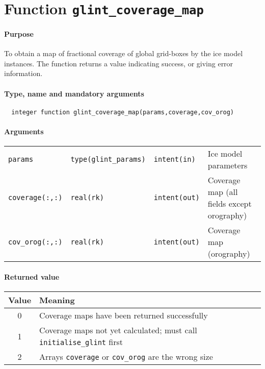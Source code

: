\section{Function \texttt{glint\_coverage\_map}}
%
\paragraph{Purpose} To obtain a map of fractional coverage of global
grid-boxes by the ice model instances. The function returns a value
indicating success, or giving error information.
%
\paragraph{Type, name and mandatory arguments}
%
\begin{verbatim}
  integer function glint_coverage_map(params,coverage,cov_orog)
\end{verbatim}
%
\paragraph{Arguments}
%
\begin{center}
  \tablefirsthead{%
    \hline
  } 
      \tablelasttail{\hline}
        \begin{supertabular}{lllp{5.5cm}}
	\texttt{params} & \texttt{type(glint\_params)} & \texttt{intent(in)} & Ice model parameters \\
\texttt{coverage(:,:)} & \texttt{real(rk)} & \texttt{intent(out)} & Coverage
map (all fields except orography) \\
\texttt{cov\_orog(:,:)} & \texttt{real(rk)} & \texttt{intent(out)} & Coverage
map (orography) \\
\end{supertabular}
\end{center}
%
\paragraph{Returned value}
%
\begin{center}
\begin{tabular}{cl}
\hline
Value & Meaning \\
\hline
\hline
0 & Coverage maps have been returned successfully \\
1 & Coverage maps not yet calculated; must call \texttt{initialise\_glint}
first \\
2 & Arrays \texttt{coverage} or \texttt{cov\_orog} are the wrong size \\
\hline
\end{tabular}
\end{center}
%
%

